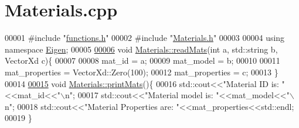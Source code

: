 \hypertarget{_materials_8cpp_source}{}\section{Materials.\+cpp}
\label{_materials_8cpp_source}

\begin{DoxyCode}
00001 \textcolor{preprocessor}{#include "\hyperlink{functions_8h}{functions.h}"}
00002 \textcolor{preprocessor}{#include "\hyperlink{_materials_8h}{Materials.h}"}
00003 
00004 \textcolor{keyword}{using namespace }\hyperlink{namespace_eigen}{Eigen};
00005 
\hyperlink{class_materials_a06e59a5742730b2292d39b7488523505}{00006} \textcolor{keywordtype}{void} \hyperlink{class_materials_a06e59a5742730b2292d39b7488523505}{Materials::readMats}(\textcolor{keywordtype}{int} a, std::string b, VectorXd c)\{
00007 
00008     mat\_id = a;
00009     mat\_model = b;
00010 
00011     mat\_properties = VectorXd::Zero(100);
00012     mat\_properties = c;
00013 \}
00014 
\hyperlink{class_materials_acce0e8fc2993ca136273747fd75b8fc1}{00015} \textcolor{keywordtype}{void} \hyperlink{class_materials_acce0e8fc2993ca136273747fd75b8fc1}{Materials::printMats}()\{
00016     std::cout<<\textcolor{stringliteral}{"Material ID is: "}<<mat\_id<<\textcolor{stringliteral}{"\(\backslash\)n"};
00017     std::cout<<\textcolor{stringliteral}{"Material model is: "}<<mat\_model<<\textcolor{stringliteral}{"\(\backslash\)n"};
00018     std::cout<<\textcolor{stringliteral}{"Material Properties are: "}<<mat\_properties<<std::endl;
00019 \}
\end{DoxyCode}
